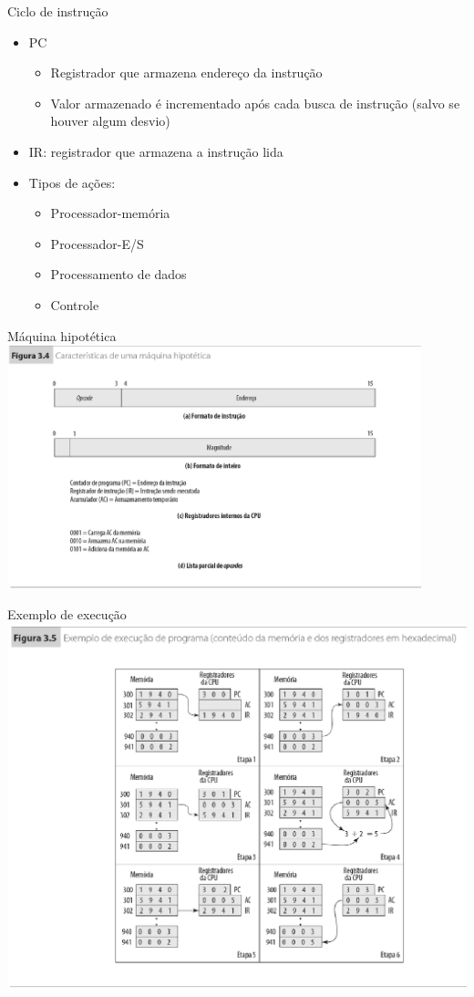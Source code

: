 \begin{slide}{Ciclo de instrução}
\begin{itemize}
   \item PC
   \begin{itemize}
      \item Registrador que armazena endereço da instrução
      \item Valor armazenado é incrementado após cada busca de instrução (salvo se houver algum desvio)
   \end{itemize}
   \item IR: registrador que armazena a instrução lida
   \item Tipos de ações:
   \begin{itemize}
      \item Processador-memória
      \item Processador-E/S
      \item Processamento de dados
      \item Controle
   \end{itemize}
\end{itemize}
\end{slide}

\begin{slide}{Máquina hipotética}
   \centering
   \includegraphics[width=0.9\textwidth]{figs/maquinahpt.eps}
\end{slide}

\begin{slide}{Exemplo de execução}
   \centering
   \includegraphics[height=0.8\textheight]{figs/exemplohpt.eps}
\end{slide}

